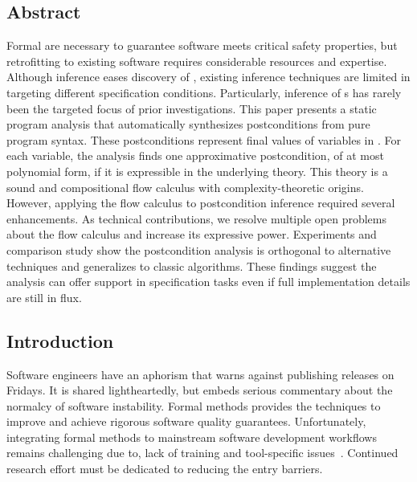 \subsection*{Abstract}

Formal  are necessary to guarantee software meets critical
safety properties, but retrofitting  to existing software
requires considerable resources and expertise. Although inference eases
discovery of , existing inference techniques are limited in
targeting different specification conditions. Particularly, inference of
s has rarely been the targeted focus of prior investigations.
This paper presents a static program analysis that automatically synthesizes
postconditions from pure program syntax. These postconditions represent final
values of variables in . For each variable, the analysis
finds one approximative postcondition, of at most polynomial form, if it is
expressible in the underlying theory. This theory is a sound and compositional
flow calculus with complexity-theoretic origins. However, applying the flow
calculus to postcondition inference required several enhancements. As technical
contributions, we resolve multiple open problems about the flow calculus and
increase its expressive power. Experiments and comparison study show the
postcondition analysis is orthogonal to alternative techniques and generalizes
to classic algorithms. These findings suggest the  analysis
can offer support in specification tasks even if full implementation details are
still in flux.

\subsection{Introduction}
\label{sec:pc-intro}

Software engineers have an aphorism that warns against publishing releases on
Fridays. It is shared lightheartedly, but embeds serious commentary about the
normalcy of software instability. Formal methods provides
the techniques to improve and achieve rigorous software quality guarantees.
Unfortunately, integrating formal methods to mainstream software development
workflows remains challenging due to, \eg lack of training and tool-specific
issues~\cite{beek2024}. Continued research effort must be dedicated to reducing
the entry barriers.

